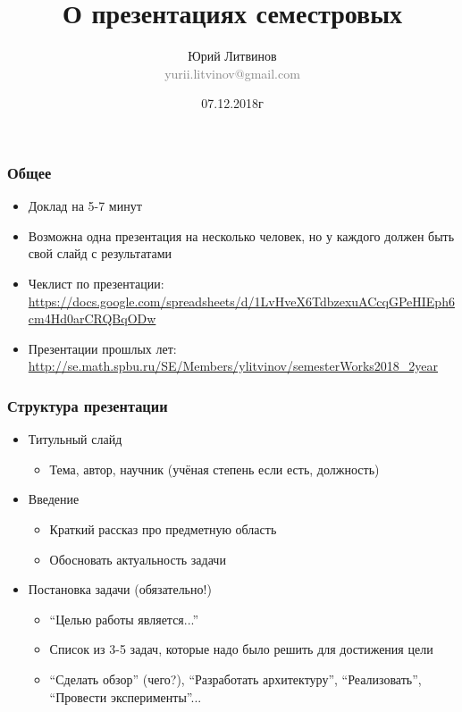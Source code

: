\documentclass[xetex,mathserif,serif]{beamer}
\title{О презентациях семестровых}
\author[Юрий Литвинов]{Юрий Литвинов\\\small{\textcolor{gray}{yurii.litvinov@gmail.com}}}
\date{07.12.2018г}
\begin{document}
	\frame{\titlepage}

	\begin{frame}
		\frametitle{Общее}
		\begin{itemize}
			\item Доклад на 5-7 минут
			\item Возможна одна презентация на несколько человек, но у каждого должен быть свой слайд с результатами
			\item Чеклист по презентации: \url{https://docs.google.com/spreadsheets/d/1LvHveX6TdbzexuACcqGPeHIEph6cm4Hd0arCRQBqODw}
			\item Презентации прошлых лет: \url{http://se.math.spbu.ru/SE/Members/ylitvinov/semesterWorks2018_2year}
		\end{itemize}
	\end{frame}

	\begin{frame}
		\frametitle{Структура презентации}
		\begin{itemize}
			\item Титульный слайд 
			\begin{itemize}
				\item Тема, автор, научник (учёная степень если есть, должность)
			\end{itemize}
			\item Введение
			\begin{itemize}
				\item Краткий рассказ про предметную область
				\item Обосновать актуальность задачи
			\end{itemize}
			\item Постановка задачи (обязательно!)
			\begin{itemize}
				\item ``Целью работы является...''
				\item Список из 3-5 задач, которые надо было решить для достижения цели
				\item ``Сделать обзор'' (чего?), ``Разработать архитектуру'', ``Реализовать'', ``Провести эксперименты''...
			\end{itemize}
		\end{itemize}
	\end{frame}
\end{document}
